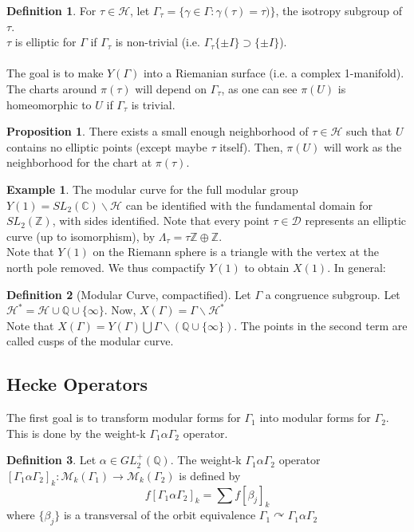 \documentclass[11pt]{article}
\theoremstyle{definition}
\newtheorem{definition}{Definition}[section]
\theoremstyle{example}
\newtheorem{example}{Example}[section]
\theoremstyle{lemma}
\theoremstyle{proposition}
\newtheorem{proposition}{Proposition}[section]
\theoremstyle{theorem}
\begin{document}
\begin{definition}
For $\tau\in \mathcal{H}$, let $\Gamma_\tau = \{ \gamma \in \Gamma : \gamma(\tau) = \tau) \}$, the isotropy subgroup of $\tau$.\\
$\tau$ is elliptic for $\Gamma$ if $\Gamma_\tau$ is non-trivial (i.e. $\Gamma_\tau \{\pm I\} \supset \{\pm I\}$).\\ \\

The goal is to make $Y(\Gamma)$ into a Riemanian surface (i.e. a complex 1-manifold). The charts around $\pi(\tau)$ will depend on $\Gamma_\tau$, as one can see $\pi(U)$ is homeomorphic to $U$ if $\Gamma_\tau$ is trivial.
\end{definition}
\begin{proposition}
There exists a small enough neighborhood of $\tau \in \mathcal{H}$ such that $U$ contains no elliptic points (except maybe $\tau$ itself). Then, $\pi(U)$ will work as the neighborhood for the chart at $\pi(\tau)$.
\end{proposition}

\begin{example}
The modular curve for the full modular group $Y(1) = SL_2(\mathbb{C})\backslash \mathcal{H}$ can be identified with the fundamental domain for $SL_2(\mathbb{Z})$, with sides identified.
Note that every point $\tau \in \mathcal{D}$ represents an elliptic curve (up to isomorphism), by $\Lambda_\tau = \tau\mathbb{Z}\oplus\mathbb{Z}$.\\
Note that $Y(1)$ on the Riemann sphere is a triangle with the vertex at the north pole removed. We thus compactify $Y(1)$ to obtain $X(1)$. In general:
\end{example}

\begin{definition}[Modular Curve, compactified]
Let $\Gamma$ a congruence subgroup. Let $\mathcal{H}^* = \mathcal{H}\cup \mathbb{Q}\cup \{\infty\}$. Now, $X(\Gamma) = \Gamma\backslash\mathcal{H}^*$\\
 Note that $X(\Gamma) = Y(\Gamma) \bigcup \Gamma\backslash(\mathbb{Q}\cup\{\infty\})$. The points in the second term are called cusps of the modular curve.
\end{definition}




\subsection{Hecke Operators}
The first goal is to transform modular forms for $\Gamma_1$ into modular forms for $\Gamma_2$. This is done by the weight-k $\Gamma_1\alpha\Gamma_2$ operator. 
\begin{definition}
Let $\alpha\in GL_2^+(\mathbb{Q})$. The weight-k $\Gamma_1\alpha\Gamma_2$ operator $[\Gamma_1\alpha\Gamma_2]_k : \mathcal{M}_k(\Gamma_1) \to \mathcal{M}_k(\Gamma_2)$ is defined by
$$ f[\Gamma_1\alpha\Gamma_2]_k = \sum f[\beta_j]_k$$
where $\{\beta_j\}$ is a transversal of the orbit equivalence $\Gamma_1\curvearrowright\Gamma_1\alpha\Gamma_2$
\end{definition}
\end{document}
